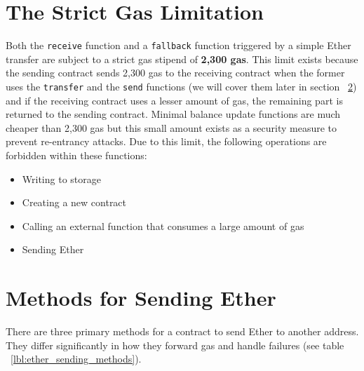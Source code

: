 \documentclass{scrbook}
\begin{document}
\newpage

\section{The Strict Gas Limitation}

Both the \texttt{receive} function and a \texttt{fallback} function triggered by a simple Ether transfer are subject to a strict gas stipend of \textbf{2,300 gas}. This limit exists because the sending contract sends 2,300 gas to the receiving contract when the former uses the \texttt{transfer} and the \texttt{send} functions (we will cover them later in section ~\ref{sct:methods_for_sending_ether}) and if the receiving contract uses a lesser amount of gas, the remaining part is returned to the sending contract. Minimal balance update functions are much cheaper than 2,300 gas but this small amount exists as a security measure to prevent re-entrancy attacks. Due to this limit, the following operations are forbidden within these functions:

\begin{itemize}
    \item Writing to storage
    \item Creating a new contract
    \item Calling an external function that consumes a large amount of gas
    \item Sending Ether
\end{itemize}

\section{Methods for Sending Ether}
\label{sct:methods_for_sending_ether}

There are three primary methods for a contract to send Ether to another address. They differ significantly in how they forward gas and handle failures (see table ~\ref{lbl:ether_sending_methods}).\\
\end{document}
